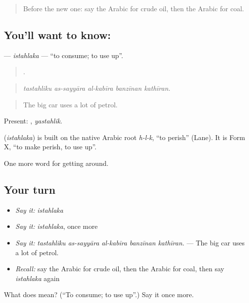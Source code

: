 \label{lesson:AR-C465-istahlaka}



\begin{quote}
Before the new one: say the Arabic for crude oil, then the Arabic for coal.
\end{quote}

\subsection*{You'll want to know: }
\textbf{} — \emph{istahlaka} — \textquotedblleft{}to consume; to use up\textquotedblright{}.

\begin{quote}
    .
\end{quote}

\begin{quote}
\emph{tastahliku as-sayyāra al-kabīra banzīnan kathīran.}
\end{quote}

\begin{quote}
The big car uses a lot of petrol.
\end{quote}

Present: , \emph{yastahlik}.

\begin{cousinweb}
\textbf{} (\emph{istahlaka}) is built on the native Arabic root \emph{h-l-k}, \textquotedblleft{}to perish\textquotedblright{} (Lane). It is Form X, \textquotedblleft{}to make perish, to use up\textquotedblright{}.
\end{cousinweb}

\begin{grammarlens}[title={What you've built}]
One more word for getting around.
\end{grammarlens}

\subsection*{Your turn}
\begin{itemize}
\raggedright
  \item \emph{Say it:} \emph{istahlaka}
  \item \emph{Say it:} \emph{istahlaka}, once more
  \item \emph{Say it:} \emph{tastahliku as-sayyāra al-kabīra banzīnan kathīran.} — The big car uses a lot of petrol.
  \item \emph{Recall:} say the Arabic for crude oil, then the Arabic for coal, then say \emph{istahlaka} again
\end{itemize}

\begin{tcolorbox}[breakable,colback=teal!4,colframe=teal!35!black,title={Before you move on}]
What does  mean? (\textquotedblleft{}To consume; to use up\textquotedblright{}.) Say it once more.
\end{tcolorbox}
